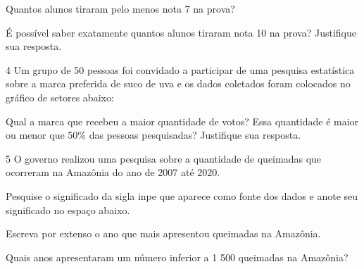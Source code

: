 \begin{escolha}
\item
  Quantos alunos tiraram pelo menos nota 7 na prova?


\item
  É possível saber exatamente quantos alunos tiraram nota 10 na prova?
  Justifique sua resposta.

\end{escolha}


\num{4} Um grupo de 50 pessoas foi convidado a participar de uma pesquisa
estatística sobre a marca preferida de suco de uva e os dados coletados
foram colocados no gráfico de setores abaixo:


Qual a marca que recebeu a maior quantidade de votos? Essa quantidade é
maior ou menor que 50\% das pessoas pesquisadas? Justifique sua
resposta.



\num{5} O governo realizou uma pesquisa sobre a quantidade de queimadas que
ocorreram na Amazônia do ano de 2007 até 2020.


\begin{escolha}
\item
  Pesquise o significado da sigla inpe que aparece como fonte dos dados
  e anote seu significado no espaço abaixo.


\item
  Escreva por extenso o ano que mais apresentou queimadas na Amazônia.


\item
  Quais anos apresentaram um número inferior a 1 500 queimadas na
  Amazônia?

\end{escolha}

